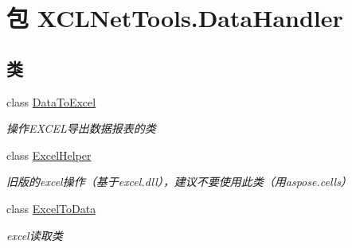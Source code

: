 \hypertarget{namespace_x_c_l_net_tools_1_1_data_handler}{\section{包 X\-C\-L\-Net\-Tools.\-Data\-Handler}
\label{namespace_x_c_l_net_tools_1_1_data_handler}
}
\subsection*{类}
\begin{DoxyCompactItemize}
\item 
class \hyperlink{class_x_c_l_net_tools_1_1_data_handler_1_1_data_to_excel}{Data\-To\-Excel}
\begin{DoxyCompactList}\small\item\em 操作\-E\-X\-C\-E\-L导出数据报表的类 \end{DoxyCompactList}\item 
class \hyperlink{class_x_c_l_net_tools_1_1_data_handler_1_1_excel_helper}{Excel\-Helper}
\begin{DoxyCompactList}\small\item\em 旧版的excel操作（基于excel.\-dll），建议不要使用此类（用aspose.\-cells） \end{DoxyCompactList}\item 
class \hyperlink{class_x_c_l_net_tools_1_1_data_handler_1_1_excel_to_data}{Excel\-To\-Data}
\begin{DoxyCompactList}\small\item\em excel读取类 \end{DoxyCompactList}\end{DoxyCompactItemize}

